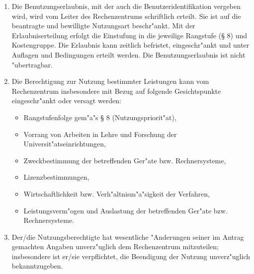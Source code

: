 \begin{enumerate}
  \item Die Benutzungserlaubnis, mit der auch die Benutzeridentifikation
    vergeben wird, wird vom Leiter des Rechenzentrums schriftlich erteilt. Sie
    ist auf die beantragte und bewilligte Nutzungsart beschr"ankt. Mit der
    Erlaubniserteilung erfolgt die Einstufung in die jeweilige Rangstufe (\S{} 8)
    und Kostengruppe. Die Erlaubnis kann zeitlich befristet, eingeschr"ankt
    und unter Auflagen und Bedingungen erteilt werden. Die Benutzungserlaubnis
    ist nicht "ubertragbar.

  \item Die Berechtigung zur Nutzung bestimmter Leistungen kann vom
    Rechenzentrum insbesondere mit Bezug auf folgende Gesichtspunkte
    eingeschr"ankt oder versagt werden:

    \begin{itemize}
      \item Rangstufenfolge gem"a"s \S{} 8 (Nutzungspriorit"at),
      \item Vorrang von Arbeiten in Lehre und Forschung der
        Universit"atseinrichtungen,
      \item Zweckbestimmung der betreffenden Ger"ate bzw. Rechnersysteme,
      \item Lizenzbestimmungen,
      \item Wirtschaftlichkeit bzw. Verh"altnism"a"sigkeit der
        Verfahren,
      \item Leistungsverm"ogen und Auslastung der betreffenden
        Ger"ate bzw. Rechnersysteme.
    \end{itemize}

 \item Der/die Nutzungsberechtigte hat wesentliche "Anderungen seiner im
   Antrag gemachten Angaben unverz"uglich dem Rechenzentrum mitzuteilen;
   insbesondere ist er/sie verpflichtet, die Beendigung der Nutzung
   unverz"uglich bekanntzugeben.
\end{enumerate}


